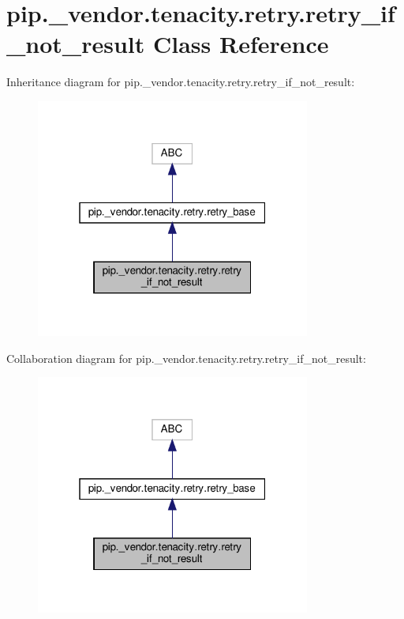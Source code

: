 \hypertarget{classpip_1_1__vendor_1_1tenacity_1_1retry_1_1retry__if__not__result}{}\section{pip.\+\_\+vendor.\+tenacity.\+retry.\+retry\+\_\+if\+\_\+not\+\_\+result Class Reference}
\label{classpip_1_1__vendor_1_1tenacity_1_1retry_1_1retry__if__not__result}


Inheritance diagram for pip.\+\_\+vendor.\+tenacity.\+retry.\+retry\+\_\+if\+\_\+not\+\_\+result\+:
\nopagebreak
\begin{figure}[H]
\begin{center}
\leavevmode
\includegraphics[width=256pt]{classpip_1_1__vendor_1_1tenacity_1_1retry_1_1retry__if__not__result__inherit__graph}
\end{center}
\end{figure}


Collaboration diagram for pip.\+\_\+vendor.\+tenacity.\+retry.\+retry\+\_\+if\+\_\+not\+\_\+result\+:
\nopagebreak
\begin{figure}[H]
\begin{center}
\leavevmode
\includegraphics[width=256pt]{classpip_1_1__vendor_1_1tenacity_1_1retry_1_1retry__if__not__result__coll__graph}
\end{center}
\end{figure}
